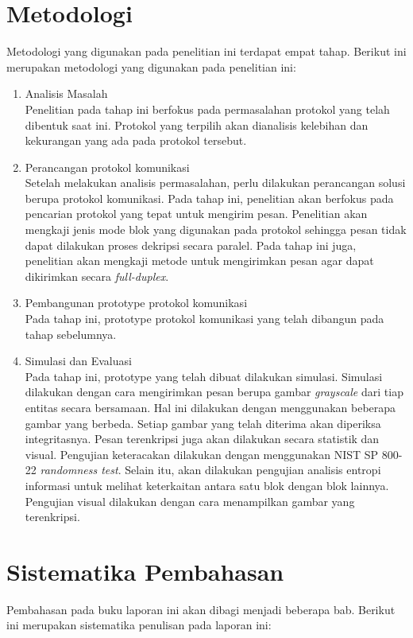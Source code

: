 \section{Metodologi}
Metodologi yang digunakan pada penelitian ini terdapat empat tahap. Berikut ini merupakan metodologi yang digunakan pada penelitian ini:
\begin{enumerate}
  \item Analisis Masalah\\
  Penelitian pada tahap ini berfokus pada permasalahan protokol yang telah dibentuk saat ini. Protokol yang terpilih akan dianalisis kelebihan dan kekurangan yang ada pada protokol tersebut.

  \item Perancangan protokol komunikasi\\
  Setelah melakukan analisis permasalahan, perlu dilakukan perancangan solusi berupa protokol komunikasi. Pada tahap ini, penelitian akan berfokus pada pencarian protokol yang tepat untuk mengirim pesan. Penelitian akan mengkaji jenis mode blok yang digunakan pada protokol sehingga pesan tidak dapat dilakukan proses dekripsi secara paralel. Pada tahap ini juga, penelitian akan mengkaji metode untuk mengirimkan pesan agar dapat dikirimkan secara \emph{full-duplex}.

  \item Pembangunan prototype protokol komunikasi\\
  Pada tahap ini, prototype protokol komunikasi yang telah dibangun pada tahap sebelumnya.

  \item Simulasi dan Evaluasi\\
  Pada tahap ini, prototype yang telah dibuat dilakukan simulasi. Simulasi dilakukan dengan cara mengirimkan pesan berupa gambar \emph{grayscale} dari tiap entitas secara bersamaan. Hal ini dilakukan dengan menggunakan beberapa gambar yang berbeda. Setiap gambar yang telah diterima akan diperiksa integritasnya. Pesan terenkripsi juga akan dilakukan secara statistik dan visual. Pengujian keteracakan dilakukan dengan menggunakan NIST SP 800-22 \emph{randomness test}. Selain itu, akan dilakukan pengujian analisis entropi informasi untuk melihat keterkaitan antara satu blok dengan blok lainnya. Pengujian visual dilakukan dengan cara menampilkan gambar yang terenkripsi.

\end{enumerate}

\section{Sistematika Pembahasan}
Pembahasan pada buku laporan ini akan dibagi menjadi beberapa bab. Berikut ini merupakan sistematika penulisan pada laporan ini:

